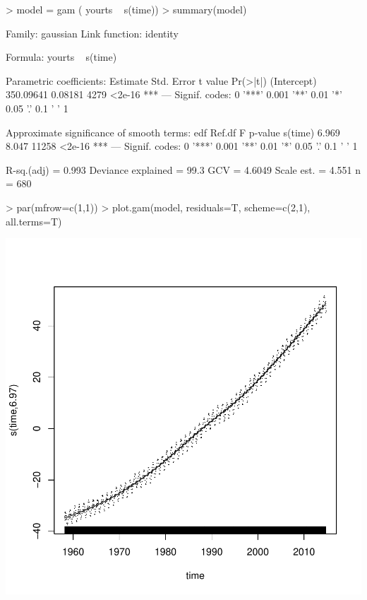 \documentclass[11pt, a4paper]{article} %
\begin{document}
\begin{Schunk}
\begin{Sinput}
> model = gam ( yourts ~ s(time))
> summary(model)
\end{Sinput}
Family: gaussian 
Link function: identity 

Formula:
yourts ~ s(time)

Parametric coefficients:
             Estimate Std. Error t value Pr(>|t|)    
(Intercept) 350.09641    0.08181    4279   <2e-16 ***
---
Signif. codes:  
0 '***' 0.001 '**' 0.01 '*' 0.05 '.' 0.1 ' ' 1

Approximate significance of smooth terms:
          edf Ref.df     F p-value    
s(time) 6.969  8.047 11258  <2e-16 ***
---
Signif. codes:  
0 '***' 0.001 '**' 0.01 '*' 0.05 '.' 0.1 ' ' 1

R-sq.(adj) =  0.993   Deviance explained = 99.3%
GCV = 4.6049  Scale est. = 4.551     n = 680\end{Schunk}

\begin{Schunk}
\begin{Sinput}
> par(mfrow=c(1,1))
> plot.gam(model, residuals=T, scheme=c(2,1), all.terms=T)
\end{Sinput}
\end{Schunk}
\includegraphics{alleselena-056}
\end{document}
